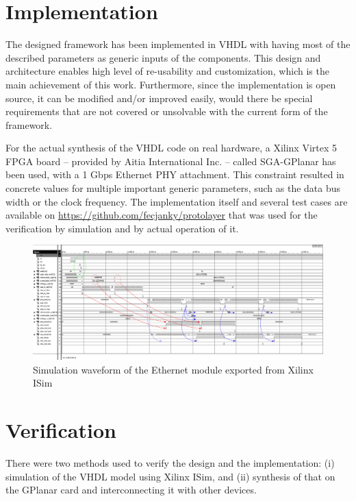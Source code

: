 \documentclass[conference]{IEEEtran}
\begin{document}
\section{Implementation}\label{sec:Implementation}

The designed framework has been implemented in VHDL with having most of the described parameters as generic inputs of
the components. This design and architecture enables high level of re-usability and customization, which is the main
achievement of this work. Furthermore, since the implementation is open source, it can be modified and/or improved
easily, would there be special requirements that are not covered or unsolvable with the current form of the framework.

For the actual synthesis of the VHDL code on real hardware, a Xilinx Virtex 5 FPGA board -- provided by Aitia
International Inc. -- called SGA-GPlanar \cite{GPlanar} has been used, with a 1 Gbps Ethernet PHY attachment. This
constraint resulted in concrete values for multiple important generic parameters, such as the data bus width or the
clock frequency.
The implementation itself and several test cases are available on \cite{GIT_protolayer}
\url{https://github.com/fecjanky/protolayer} that was used for the verification by simulation and by actual operation
of it.

\begin{figure}[!htb]
    \centering
    \includegraphics[width=1\textwidth]{figures_raw/ether_tst_wave_annotated.png}
    \caption{Simulation waveform of the Ethernet module exported from Xilinx ISim}
    \label{fig:eth_sim}
\end{figure}

\section{Verification}\label{sec:Verification}

There were two methods used to verify the design and the implementation: (i) simulation of the VHDL model
using Xilinx ISim, and (ii) synthesis of that on the GPlanar card and interconnecting it with other
devices.
\end{document}
